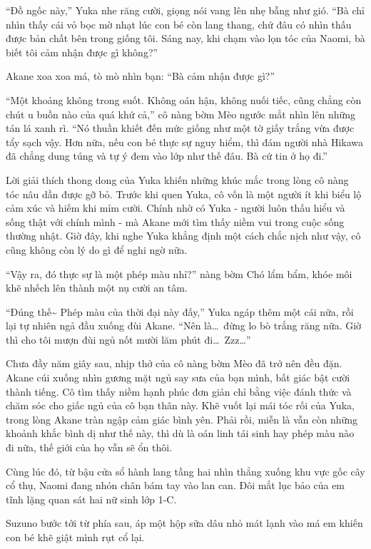 \documentclass[../main.tex]{subfiles}
\begin{document}
``Đồ ngốc này,'' Yuka nhe răng cười, giọng nói vang lên nhẹ bẫng như gió. ``Bà chỉ nhìn thấy cái vỏ bọc mờ nhạt lúc con bé còn lang thang, chứ đâu có nhìn thấu được bản chất bên trong giống tôi. Sáng nay, khi chạm vào lọn tóc của Naomi, bà biết tôi cảm nhận được gì không?''

Akane xoa xoa má, tò mò nhìn bạn: ``Bà cảm nhận được gì?''

``Một khoảng không trong suốt. Không oán hận, không nuối tiếc, cũng chẳng còn chút u buồn nào của quá khứ cả,'' cô nàng bờm Mèo ngước mắt nhìn lên những tán lá xanh rì. ``Nó thuần khiết đến mức giống như một tờ giấy trắng vừa được tẩy sạch vậy. Hơn nữa, nếu con bé thực sự nguy hiểm, thì đám người nhà Hikawa đã chẳng dung túng và tự ý đem vào lớp như thế đâu. Bà cứ tin ở họ đi.''

Lời giải thích thong dong của Yuka khiến những khúc mắc trong lòng cô nàng tóc nâu dần được gỡ bỏ. Trước khi quen Yuka, cô vốn là một người ít khi biểu lộ cảm xúc và hiếm khi mỉm cười. Chính nhờ có Yuka - người luôn thấu hiểu và sống thật với chính mình - mà Akane mới tìm thấy niềm vui trong cuộc sống thường nhật. Giờ đây, khi nghe Yuka khẳng định một cách chắc nịch như vậy, cô cũng không còn lý do gì để nghi ngờ nữa.

``Vậy ra, đó thực sự là một phép màu nhỉ?'' nàng bờm Chó lẩm bẩm, khóe môi khẽ nhếch lên thành một nụ cười an tâm.

``Đúng thế\~{} Phép màu của thời đại này đấy,'' Yuka ngáp thêm một cái nữa, rồi lại tự nhiên ngả đầu xuống đùi Akane. ``Nên là\dots\ đừng lo bò trắng răng nữa. Giờ thì cho tôi mượn đùi ngủ nốt mười lăm phút đi\dots\ Zzz\dots''

Chưa đầy năm giây sau, nhịp thở của cô nàng bờm Mèo đã trở nên đều đặn. Akane cúi xuống nhìn gương mặt ngủ say sưa của bạn mình, bất giác bật cười thành tiếng. Cô tìm thấy niềm hạnh phúc đơn giản chỉ bằng việc đánh thức và chăm sóc cho giấc ngủ của cô bạn thân này. Khẽ vuốt lại mái tóc rối của Yuka, trong lòng Akane tràn ngập cảm giác bình yên. Phải rồi, miễn là vẫn còn những khoảnh khắc bình dị như thế này, thì dù là oán linh tái sinh hay phép màu nào đi nữa, thế giới của họ vẫn sẽ ổn thôi.

Cùng lúc đó, từ bậu cửa sổ hành lang tầng hai nhìn thẳng xuống khu vực gốc cây cổ thụ, Naomi đang nhón chân bám tay vào lan can. Đôi mắt lục bảo của em tĩnh lặng quan sát hai nữ sinh lớp 1-C.

Suzuno bước tới từ phía sau, áp một hộp sữa dâu nhỏ mát lạnh vào má em khiến con bé khẽ giật mình rụt cổ lại.
\end{document}
